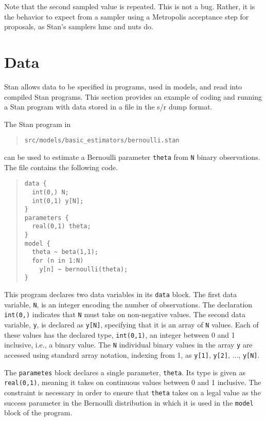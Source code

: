 \documentclass[10pt]{report}
\newcommand{\Stan}{Stan\xspace}
\newcommand{\acronym}[1]{{\sc #1}\xspace}
\newcommand{\R}{\acronym{r}}
\newcommand{\SPLUS}{\acronym{s}}
\newcommand{\HMC}{\acronym{hmc}}
\newcommand{\NUTS}{\acronym{nuts}}
\newcommand{\code}[1]{{\tt #1}}
\begin{document}
Note that the second sampled value is repeated.  This is not a bug.
Rather, it is the behavior to expect from a sampler using a Metropolis
acceptance step for proposals, as \Stan's samplers \HMC and \NUTS do.

\section{Data}

\Stan allows data to be specified in programs, used in models, and
read into compiled \Stan programs. This section provides an example of
coding and running a \Stan program with data stored in a file in the
\SPLUS/\R dump format.

The \Stan program in 
\begin{quote}
\begin{Verbatim}
src/models/basic_estimators/bernoulli.stan
\end{Verbatim}
\end{quote}
can be used to estimate a Bernoulli parameter \code{theta} from
\code{N} binary observations.  The file contains the following code.
%
\begin{quote}
\begin{Verbatim}
data {
  int(0,) N;
  int(0,1) y[N];
}
parameters {
  real(0,1) theta;
}
model {
  theta ~ beta(1,1);
  for (n in 1:N)
    y[n] ~ bernoulli(theta);
}
\end{Verbatim}
\end{quote}
%
This program declares two data variables in its \code{data} block.
The first data variable, \code{N}, is an integer encoding the number
of observations.  The declaration \code{int(0,)} indicates that
\code{N} must take on non-negative values.  The second data variable,
\code{y}, is declared as \code{y[N]}, specifying that it is an array
of \code{N} values.  Each of these values has the declared type,
\code{int(0,1)}, an integer between 0 and 1 inclusive, i.e., a binary
value.  The \code{N} individual binary values in the array \code{y}
are accessed using standard array notation, indexing from 1, as \code{y[1]},
\code{y[2]}, ..., \code{y[N]}.

The \code{parametes} block declares a single parameter, \code{theta}.
Its type is given as \code{real(0,1)}, meaning it takes on continuous
values between 0 and 1 inclusive.  The constraint is necessary in
order to ensure that \code{theta} takes on a legal value as the
success parameter in the Bernoulli distribution in which it is used in
the \code{model} block of the program.
\end{document}
